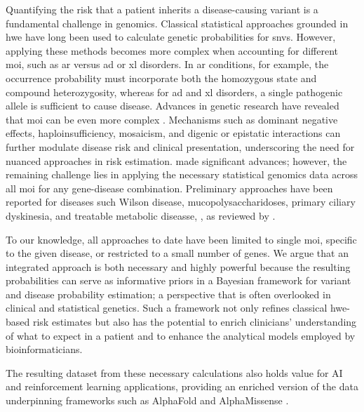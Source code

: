 Quantifying the risk that a patient inherits a disease-causing variant is a fundamental challenge in genomics. 
Classical statistical approaches grounded in \ac{hwe} \cite{MayoCentury2008, AbramovsHardyWeinberg2020} have long been used to calculate genetic probabilities for \ac{snv}s. 
However, applying these methods becomes more complex when accounting for different \ac{moi}, such as \ac{ar} versus \ac{ad} or \ac{xl} disorders. 
In \ac{ar} conditions, for example, the occurrence probability must incorporate both the homozygous state and compound heterozygosity, whereas for \ac{ad} and \ac{xl} disorders, a single pathogenic allele is sufficient to cause disease. 
Advances in genetic research have revealed that \ac{moi} can be even more complex \cite{zschocke_mendelian_2023}. 
Mechanisms such as dominant negative effects, haploinsufficiency, mosaicism, and digenic or epistatic interactions can further modulate disease risk and clinical presentation, underscoring the need for nuanced approaches in risk estimation.
\citet{karczewski2020mutational} made significant advances; however, the remaining challenge lies in applying the necessary statistical genomics data across all \ac{moi} for any gene-disease combination.
Preliminary approaches have been reported for diseases such Wilson disease, mucopolysaccharidoses,  primary ciliary dyskinesia, and treatable metabolic diseasse, 
\cite{bick_estimating_2025, evans_estimating_2021}, 
as reviewed by \citet{hannah_using_2024}.

To our knowledge, all approaches to date have been limited to single \ac{moi}, specific to the given disease, or restricted to a small number of genes.
We argue that an  integrated approach is both necessary and highly powerful because the resulting probabilities can serve as informative priors in a Bayesian framework for variant and disease probability estimation; a perspective that is often overlooked in clinical and statistical genetics. 
Such a framework not only refines classical \ac{hwe}-based risk estimates but also has the potential to enrich clinicians’ understanding of what to expect in a patient and to enhance the analytical models employed by bioinformaticians.

The resulting dataset from these necessary calculations also holds value for AI and reinforcement learning applications, providing an enriched version of the data underpinning frameworks such as AlphaFold \cite{jumper_highly_2021} and AlphaMissense \cite{cheng_accurate_2023}.

